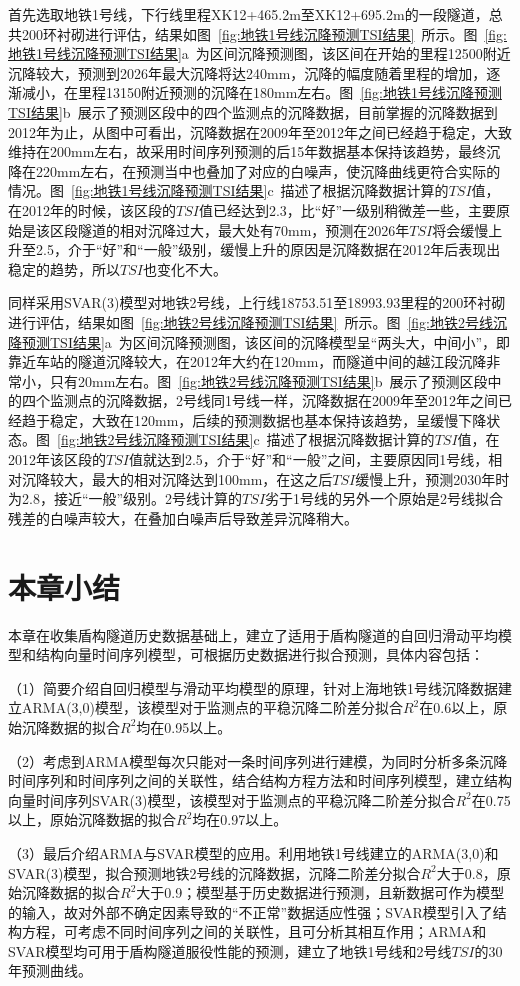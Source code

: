 首先选取地铁1号线，下行线里程XK12+465.2m至XK12+695.2m的一段隧道，总共200环衬砌进行评估，结果如图~\ref{fig:地铁1号线沉降预测TSI结果}~所示。图~\ref{fig:地铁1号线沉降预测TSI结果}a~为区间沉降预测图，该区间在开始的里程12500附近沉降较大，预测到2026年最大沉降将达240mm，沉降的幅度随着里程的增加，逐渐减小，在里程13150附近预测的沉降在180mm左右。图~\ref{fig:地铁1号线沉降预测TSI结果}b~展示了预测区段中的四个监测点的沉降数据，目前掌握的沉降数据到2012年为止，从图中可看出，沉降数据在2009年至2012年之间已经趋于稳定，大致维持在200mm左右，故采用时间序列预测的后15年数据基本保持该趋势，最终沉降在220mm左右，在预测当中也叠加了对应的白噪声，使沉降曲线更符合实际的情况。图~\ref{fig:地铁1号线沉降预测TSI结果}c~描述了根据沉降数据计算的$TSI$值，在2012年的时候，该区段的$TSI$值已经达到2.3，比“好”一级别稍微差一些，主要原始是该区段隧道的相对沉降过大，最大处有70mm，预测在2026年$TSI$将会缓慢上升至2.5，介于“好”和“一般”级别，缓慢上升的原因是沉降数据在2012年后表现出稳定的趋势，所以$TSI$也变化不大。

同样采用SVAR(3)模型对地铁2号线，上行线18753.51至18993.93里程的200环衬砌进行评估，结果如图~\ref{fig:地铁2号线沉降预测TSI结果}~所示。图~\ref{fig:地铁2号线沉降预测TSI结果}a~为区间沉降预测图，该区间的沉降模型呈“两头大，中间小”，即靠近车站的隧道沉降较大，在2012年大约在120mm，而隧道中间的越江段沉降非常小，只有20mm左右。图~\ref{fig:地铁2号线沉降预测TSI结果}b~展示了预测区段中的四个监测点的沉降数据，2号线同1号线一样，沉降数据在2009年至2012年之间已经趋于稳定，大致在120mm，后续的预测数据也基本保持该趋势，呈缓慢下降状态。图~\ref{fig:地铁2号线沉降预测TSI结果}c~描述了根据沉降数据计算的$TSI$值，在2012年该区段的$TSI$值就达到2.5，介于“好”和“一般”之间，主要原因同1号线，相对沉降较大，最大的相对沉降达到100mm，在这之后$TSI$缓慢上升，预测2030年时为2.8，接近“一般”级别。2号线计算的$TSI$劣于1号线的另外一个原始是2号线拟合残差的白噪声较大，在叠加白噪声后导致差异沉降稍大。


\section{本章小结}

本章在收集盾构隧道历史数据基础上，建立了适用于盾构隧道的自回归滑动平均模型和结构向量时间序列模型，可根据历史数据进行拟合预测，具体内容包括：

（1）简要介绍自回归模型与滑动平均模型的原理，针对上海地铁1号线沉降数据建立ARMA(3,0)模型，该模型对于监测点的平稳沉降二阶差分拟合$R^2$在0.6以上，原始沉降数据的拟合$R^2$均在0.95以上。

（2）考虑到ARMA模型每次只能对一条时间序列进行建模，为同时分析多条沉降时间序列和时间序列之间的关联性，结合结构方程方法和时间序列模型，建立结构向量时间序列SVAR(3)模型，该模型对于监测点的平稳沉降二阶差分拟合$R^2$在0.75以上，原始沉降数据的拟合$R^2$均在0.97以上。

（3）最后介绍ARMA与SVAR模型的应用。利用地铁1号线建立的ARMA(3,0)和SVAR(3)模型，拟合预测地铁2号线的沉降数据，沉降二阶差分拟合$R^2$大于0.8，原始沉降数据的拟合$R^2$大于0.9；模型基于历史数据进行预测，且新数据可作为模型的输入，故对外部不确定因素导致的“不正常”数据适应性强；SVAR模型引入了结构方程，可考虑不同时间序列之间的关联性，且可分析其相互作用；ARMA和SVAR模型均可用于盾构隧道服役性能的预测，建立了地铁1号线和2号线$TSI$的30年预测曲线。

